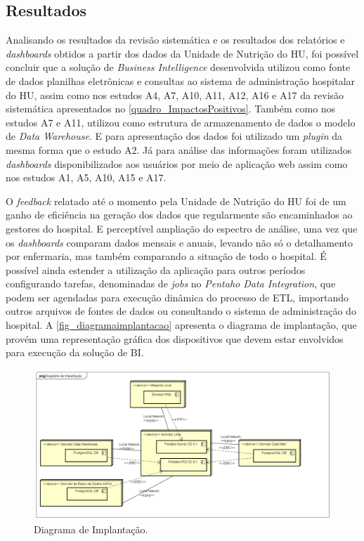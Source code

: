 \subsection{Resultados}

Analisando os resultados da revisão sistemática e os resultados dos relatórios e \textit{dashboards} obtidos a partir dos dados da Unidade de Nutrição do HU, foi possível concluir que a solução de \textit{Business Intelligence} desenvolvida utilizou como fonte de dados planilhas eletrônicas e consultas ao sistema de administração hospitalar do HU, assim como nos estudos A4, A7, A10, A11, A12, A16 e A17 da revisão sistemática apresentados no \autoref{quadro_ImpactosPositivos}. Também como nos estudos A7 e A11, utilizou como estrutura de armazenamento de dados o modelo de \textit{Data Warehouse}. E para apresentação dos dados foi utilizado um \textit{plugin} da mesma forma que o estudo A2. Já para análise das informações foram utilizados \textit{dashboards} disponibilizados aos usuários por meio de aplicação web assim como nos estudos A1, A5, A10, A15 e A17.

O \textit{feedback} relatado até o momento pela Unidade de Nutrição do HU foi de um ganho de eficiência na geração dos dados que regularmente são encaminhados ao gestores do hospital. E perceptível ampliação do espectro de análise, uma vez que os \textit{dashboards} comparam dados mensais e anuais, levando não só o detalhamento por enfermaria, mas também comparando a situação de todo o hospital. É possível ainda estender a utilização da aplicação para outros períodos configurando tarefas, denominadas de \textit{jobs} no \textit{Pentaho Data Integration}, que podem ser agendadas para execução dinâmica do processo de ETL, importando outros arquivos de fontes de dados ou consultando o sistema de administração do hospital. A \autoref{fig_diagramaimplantacao} apresenta o diagrama de implantação, que provém uma representação gráfica dos dispositivos que devem estar envolvidos para execução da solução de BI. 

\begin{figure}[htb]
	\caption{\label{fig_diagramaimplantacao}Diagrama de Implantação.}
	\begin{center}
	    \includegraphics[scale=0.41]{Imagens/figura - diagrama de implantação.png}
	\end{center}
\end{figure}

